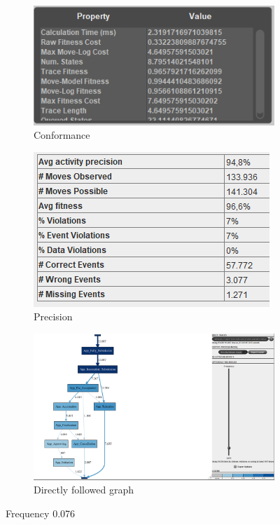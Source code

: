 \begin{figure}[!htbp]
\centering
\begin{subfigure}{.4\textwidth}
  \centering
  \includegraphics[width=\linewidth]{App_Conformance0-076.PNG}
  \caption{Conformance}
  \label{fig:APP_Conf0-076}
\end{subfigure}
\begin{subfigure}{.4\textwidth}
  \centering
  \includegraphics[width=\linewidth]{App_Precision0-076.PNG}
  \caption{Precision}
  \label{fig:APP_Prec0-076}
\end{subfigure}
\begin{subfigure}{0.8\textwidth}
  \centering
  \includegraphics[width=\linewidth]{App_DirectlyFollowedFreq0-076.PNG}
  \caption{Directly followed graph}
  \label{fig:APP_DF0-076}
\end{subfigure}%
\caption{Frequency 0.076}
\label{fig:App_Prec}
\end{figure}

